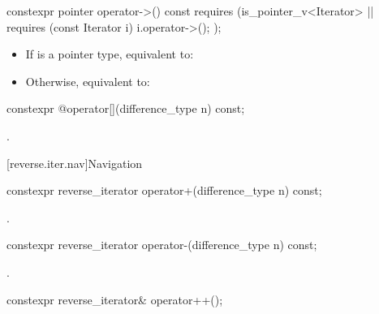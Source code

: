 %
\begin{itemdecl}
constexpr pointer operator->() const
  requires (is_pointer_v<Iterator> ||
            requires (const Iterator i) { i.operator->(); });
\end{itemdecl}

\begin{itemdescr}
\pnum
\effects
\begin{itemize}
\item If  is a pointer type, equivalent to:

\item Otherwise, equivalent to:
\end{itemize}
\end{itemdescr}

%
\begin{itemdecl}
constexpr @\unspec@ operator[](difference_type n) const;
\end{itemdecl}

\begin{itemdescr}
\pnum
\returns
{}.
\end{itemdescr}

[reverse.iter.nav]{Navigation}

%
\begin{itemdecl}
constexpr reverse_iterator operator+(difference_type n) const;
\end{itemdecl}

\begin{itemdescr}
\pnum
\returns
{}.
\end{itemdescr}

%
\begin{itemdecl}
constexpr reverse_iterator operator-(difference_type n) const;
\end{itemdecl}

\begin{itemdescr}
\pnum
\returns
{}.
\end{itemdescr}

%
\begin{itemdecl}
constexpr reverse_iterator& operator++();
\end{itemdecl}

